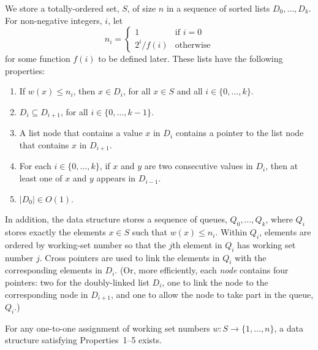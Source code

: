 \documentclass{patmorin}
\begin{document}
We store a totally-ordered set, $S$, of size $n$ in a sequence of sorted
lists $D_0,\ldots,D_k$.  For non-negative integers, $i$, let
\[  n_i=\begin{cases}
       1 & \text{if $i=0$} \\
       2^{i}/f(i) & \text{otherwise}
    \end{cases}
\]
for some function $f(i)$ to be defined later.  These lists have the
following properties:

\begin{enumerate}
  \item If $w(x)\le n_i$, then $x\in D_i$, for all $x\in S$ and all
    $i\in\{0,\ldots,k\}$.
  \item $D_i\subseteq D_{i+1}$, for all $i\in\{0,\ldots,k-1\}$.
  \item A list node that contains a value $x$ in $D_i$ contains a pointer
    to the list node that contains $x$ in $D_{i+1}$.
  \item For each $i\in\{0,\ldots,k\}$, if $x$ and $y$ are two consecutive
    values in $D_i$, then at least one of $x$ and $y$ appears in
    $D_{i-1}$.
  \item $|D_0| \in O(1)$.
\end{enumerate}

In addition, the data structure stores a sequence of queues,
$Q_0,\ldots,Q_k$, where $Q_i$ stores exactly the elements $x\in S$
such that $w(x)\le n_i$.  Within $Q_i$, elements are ordered by
working-set number so that the $j$th element in $Q_i$ has working set
number $j$.  Cross pointers are used to link the elements in $Q_i$
with the corresponding elements in $D_i$. (Or, more efficiently, each
\emph{node} contains four pointers: two for the doubly-linked list $D_i$,
one to link the node to the corresponding node in $D_{i+1}$, and one to
allow the node to take part in the queue, $Q_i$.)

\begin{lem}
  For any one-to-one assignment of working set numbers $w:S\to\{1,\ldots,n\}$,
  a data structure satisfying Properties~1--5 exists.
\end{lem}
\end{document}
